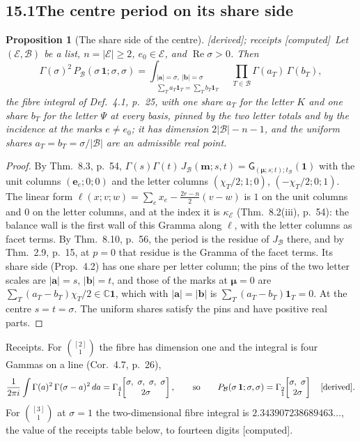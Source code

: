 \documentclass[11pt]{article}
\newcommand{\cE}{\mathcal E}
\newcommand{\cB}{\mathcal B}
\newcommand{\one}{\mathbf 1}
\newcommand{\mvec}{\mathbf m}
\newcommand{\bmu}{\boldsymbol\mu}
\newcommand{\sG}{\mathsf G}
\newcommand{\Gst}[4]{\Gamma_{\substack{#1\\#2}}\!\begin{bmatrix}#3\\#4\end{bmatrix}}
\DeclareMathOperator{\re}{Re}
\newcommand{\Pc}[1]{P_{\cB}(#1\,\one;#1,#1)}
\theoremstyle{plain}
\newtheorem{proposition}{Proposition}[section]
\theoremstyle{definition}
\theoremstyle{remark}
\newcommand{\derived}{\textup{[derived]}}
\newcommand{\computed}{\textup{[computed]}}
\begin{document}
\subsection*{15.1\quad The centre period on its share side}

\begin{proposition}[The share side of the centre]\label{a:p:share}\derived; receipts \computed\
Let $(\cE,\cB)$ be a list, $n=|\cE|\ge2$, $e_0\in\cE$, and $\re\sigma>0$. Then
\[
\Gamma(\sigma)^2\,\Pc\sigma=\int_{\substack{|\mathbf a|=\sigma,\ |\mathbf b|=\sigma\\ \sum_Ta_T\one_T=\sum_Tb_T\one_T}}\ \prod_{T\in\cB}\Gamma(a_T)\,\Gamma(b_T),
\]
the fibre integral of Def.~4.1, p.~25, with one share $a_T$ for the letter $K$ and one share $b_T$ for the letter $\Psi$ at every basis, pinned by the two letter totals and by the incidence at the marks $e\neq e_0$; it has dimension $2|\cB|-n-1$, and the uniform shares $a_T=b_T=\sigma/|\cB|$ are an admissible real point.
\end{proposition}

\begin{proof}
By Thm.~8.3, p.~54, $\Gamma(s)\Gamma(t)\,J_{\cB}(\mvec;s,t)=\sG_{(\bmu;s;t);t_{\cB}}(\one)$ with the unit columns $(\mathbf e_e;0;0)$ and the letter columns $(\chi_T/2;1;0)$, $(-\chi_T/2;0;1)$. The linear form $\ell(x;v;w)=\sum_ex_e-\frac{2r-n}2(v-w)$ is $1$ on the unit columns and $0$ on the letter columns, and at the index it is $\kappa_{\cE}$ (Thm.~8.2(iii), p.~54): the balance wall is the first wall of this Gramma along $\ell$, with the letter columns as facet terms. By Thm.~8.10, p.~56, the period is the residue of $J_{\cB}$ there, and by Thm.~2.9, p.~15, at $p=0$ that residue is the Gramma of the facet terms. Its share side (Prop.~4.2) has one share per letter column; the pins of the two letter scales are $|\mathbf a|=s$, $|\mathbf b|=t$, and those of the marks at $\bmu=0$ are $\sum_T(a_T-b_T)\chi_T/2\in\mathbb C\one$, which with $|\mathbf a|=|\mathbf b|$ is $\sum_T(a_T-b_T)\one_T=0$. At the centre $s=t=\sigma$. The uniform shares satisfy the pins and have positive real parts.
\end{proof}

\noindent Receipts. For $\binom{[2]}1$ the fibre has dimension one and the integral is four Gammas on a line (Cor.~4.7, p.~26),
\[
\frac1{2\pi i}\int\Gamma(a)^2\,\Gamma(\sigma-a)^2\,da=\Gst41{\sigma,\ \sigma,\ \sigma,\ \sigma}{2\sigma},\qquad\text{so}\qquad \Pc\sigma=\Gst21{\sigma,\ \sigma}{2\sigma}\quad\derived.
\] For $\binom{[3]}1$ at $\sigma=1$ the two-dimensional fibre integral is $2.343907238689463\ldots$, the value of the receipts table below, to fourteen digits \computed.
\end{document}
